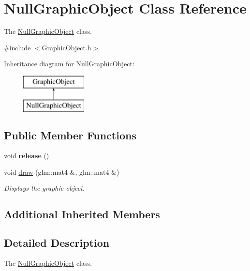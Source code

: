 \hypertarget{classNullGraphicObject}{}\section{Null\+Graphic\+Object Class Reference}
\label{classNullGraphicObject}


The \hyperlink{classNullGraphicObject}{Null\+Graphic\+Object} class.  




{\ttfamily \#include $<$Graphic\+Object.\+h$>$}

Inheritance diagram for Null\+Graphic\+Object\+:\begin{figure}[H]
\begin{center}
\leavevmode
\includegraphics[height=2.000000cm]{classNullGraphicObject}
\end{center}
\end{figure}
\subsection*{Public Member Functions}
\begin{DoxyCompactItemize}
\item 
\hypertarget{classNullGraphicObject_a30a7f189d257cff45556b20a431a4a9c}{}void {\bfseries release} ()\label{classNullGraphicObject_a30a7f189d257cff45556b20a431a4a9c}

\item 
void \hyperlink{classNullGraphicObject_a33c23cd19bac667ad7b1ccbcd9a373d2}{draw} (glm\+::mat4 \&, glm\+::mat4 \&)
\begin{DoxyCompactList}\small\item\em Displays the graphic object. \end{DoxyCompactList}\end{DoxyCompactItemize}
\subsection*{Additional Inherited Members}


\subsection{Detailed Description}
The \hyperlink{classNullGraphicObject}{Null\+Graphic\+Object} class. 

